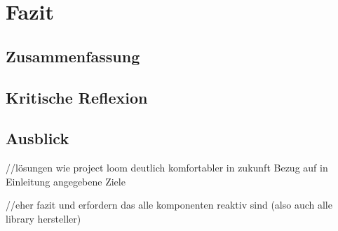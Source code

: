 \section{Fazit}
\label{sec:fazit}

\subsection{Zusammenfassung}
\subsection{Kritische Reflexion}
\subsection{Ausblick}
//lösungen wie project loom deutlich komfortabler in  zukunft
Bezug auf in Einleitung angegebene Ziele


//eher fazit
und erfordern das alle komponenten reaktiv sind (also auch alle library hersteller)
